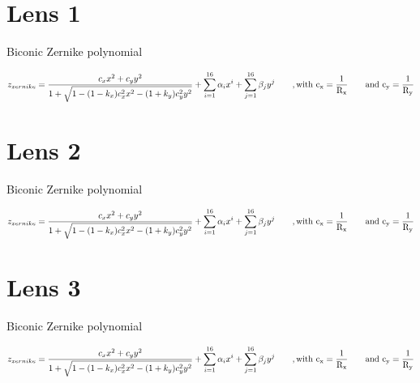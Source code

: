 \documentclass{article}
\begin{document}
\newcommand{\zernikeeq}{\begin{equation}
	z_{zernike} = \frac{c_x x^2 + c_y y^2}{1+ \sqrt{1-(1-k_x)c_x^2 x^2-(1+k_y)c_y^2y^2}} + \sum_{i=1}^{16} \alpha_i x^i + \sum_{j=1}^{16} \beta_j y^j \qquad \rm{,with\ }  c_x=\frac{1}{R_x} \qquad{and\ } c_y=\frac{1}{R_y}
\end{equation}
}


\section*{Lens 1}

\begin{table}[h]
\scriptsize
	
\end{table}
\begin{table}[h]
	\scriptsize
	
\end{table}
\begin{table}[h]
	\scriptsize
	
\end{table}


Biconic Zernike polynomial

\zernikeeq

\newpage
\section*{Lens 2}

\begin{table}[h]
	\scriptsize
	
\end{table}
\begin{table}[h]
	\scriptsize
	
\end{table}
\begin{table}[h]
	\scriptsize
	
\end{table}

Biconic Zernike polynomial

\zernikeeq


\newpage
\section*{Lens 3}
\begin{table}[h]
	\scriptsize
	
\end{table}
\begin{table}[h]
	\scriptsize
	
\end{table}
\begin{table}[h]
	\scriptsize
	
\end{table}

Biconic Zernike polynomial

\zernikeeq
\end{document}
